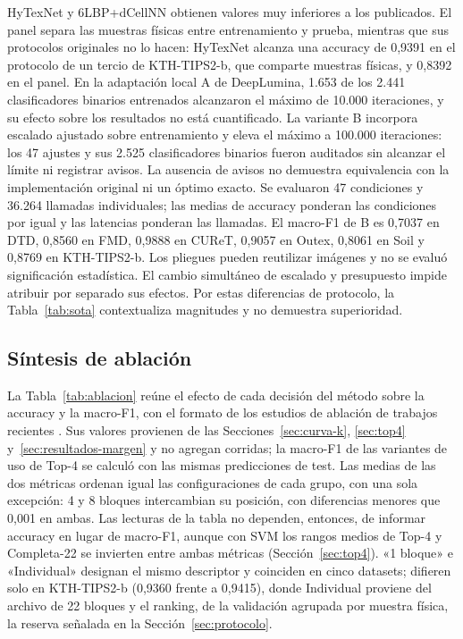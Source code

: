 \documentclass[a4paper,fleqn]{cas-sc}
\begin{document}
HyTexNet y 6LBP+dCellNN obtienen valores muy inferiores a los publicados. El panel separa las muestras físicas entre entrenamiento y prueba, mientras que sus protocolos originales no lo hacen: HyTexNet alcanza una accuracy de 0,9391 en el protocolo de un tercio de KTH-TIPS2-b, que comparte muestras físicas, y 0,8392 en el panel. En la adaptación local A de DeepLumina, 1.653 de los 2.441 clasificadores binarios entrenados alcanzaron el máximo de 10.000 iteraciones, y su efecto sobre los resultados no está cuantificado. La variante B incorpora escalado ajustado sobre entrenamiento y eleva el máximo a 100.000 iteraciones: los 47 ajustes y sus 2.525 clasificadores binarios fueron auditados sin alcanzar el límite ni registrar avisos. La ausencia de avisos no demuestra equivalencia con la implementación original ni un óptimo exacto. Se evaluaron 47 condiciones y 36.264 llamadas individuales; las medias de accuracy ponderan las condiciones por igual y las latencias ponderan las llamadas. El macro-F1 de B es 0,7037 en DTD, 0,8560 en FMD, 0,9888 en CUReT, 0,9057 en Outex, 0,8061 en Soil y 0,8769 en KTH-TIPS2-b. Los pliegues pueden reutilizar imágenes y no se evaluó significación estadística. El cambio simultáneo de escalado y presupuesto impide atribuir por separado sus efectos. Por estas diferencias de protocolo, la Tabla~\ref{tab:sota} contextualiza magnitudes y no demuestra superioridad.
\FloatBarrier

\subsection{Síntesis de ablación}\label{sec:ablacion}

La Tabla~\ref{tab:ablacion} reúne el efecto de cada decisión del método sobre la accuracy y la macro-F1, con el formato de los estudios de ablación de trabajos recientes \citep{gupta2026hytexnet}. Sus valores provienen de las Secciones~\ref{sec:curva-k}, \ref{sec:top4} y~\ref{sec:resultados-margen} y no agregan corridas; la macro-F1 de las variantes de uso de Top-4 se calculó con las mismas predicciones de test. Las medias de las dos métricas ordenan igual las configuraciones de cada grupo, con una sola excepción: 4 y 8 bloques intercambian su posición, con diferencias menores que 0,001 en ambas. Las lecturas de la tabla no dependen, entonces, de informar accuracy en lugar de macro-F1, aunque con SVM los rangos medios de Top-4 y Completa-22 se invierten entre ambas métricas (Sección~\ref{sec:top4}). «1 bloque» e «Individual» designan el mismo descriptor y coinciden en cinco datasets; difieren solo en KTH-TIPS2-b (0,9360 frente a 0,9415), donde Individual proviene del archivo de 22 bloques y el ranking, de la validación agrupada por muestra física, la reserva señalada en la Sección~\ref{sec:protocolo}.
\end{document}
